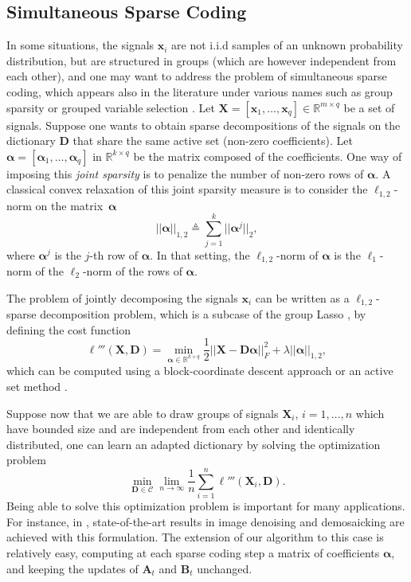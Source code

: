 \documentclass[twoside,11pt]{article}
\def\x{{\mathbf x}}
\def\l{{\ell}}
\def\X{{\mathbf X}}
\def\alphab{{\boldsymbol\alpha}}
\def\D{{\mathbf D}}
\def\B{{\mathbf B}}
\def\C{{\mathcal C}}
\def\Real{{\mathbb R}}
\def\A{{\mathbf A}}
\def\defin{\stackrel{\vartriangle}{=}}
\begin{document}
\subsection{Simultaneous Sparse Coding}
In some situations, the signals $\x_i$ are not i.i.d samples of an unknown
probability distribution, but are structured in groups (which are however
independent from each other), and one may want to address the problem of
simultaneous sparse coding, which appears also in the literature under various names such
as group sparsity or grouped variable
selection \citep{cotter2,turlach,yuan,obozinski,obozinski2,zhang,tropp2,tropp3}.  Let $\X =
[\x_1,\ldots,\x_q] \in \Real^{m \times q}$ be a set of signals.
Suppose one wants to obtain sparse decompositions of
the signals on the dictionary $\D$ that share the same active set (non-zero coefficients).
Let \mbox{$\alphab = [\alphab_1,\ldots,\alphab_q]$} in $\Real^{k \times q}$ be the matrix
composed of the coefficients. One way of imposing this \emph{joint sparsity}
is to penalize the number of non-zero rows of $\alphab$. A classical convex
relaxation of this joint sparsity measure is to consider the $\ell_{1,2}$-norm
on the matrix~$\alphab$
\begin{displaymath}
||\alphab||_{1,2} \defin \sum_{j=1}^k ||\alphab^j||_2,
\end{displaymath}
where $\alphab^j$ is the $j$-th row of $\alphab$. In that setting, the
$\ell_{1,2}$-norm of $\alphab$ is the $\ell_1$-norm of the $\ell_2$-norm of the rows
of $\alphab$.

The problem of jointly decomposing the signals $\x_i$ can be written as a
$\ell_{1,2}$-sparse decomposition problem, which is a subcase of the group
Lasso \citep{turlach,yuan,bach}, by defining the cost function 
\begin{displaymath}
  \l'''(\X,\D) = \min_{\alphab \in \Real^{k \times q}} \frac{1}{2}||\X-\D\alphab||_F^2 + \lambda ||\alphab||_{1,2},
\end{displaymath}
which can be computed using a block-coordinate descent approach \citep{friedman} or
an active set method \citep{roth2}.

Suppose now that we are able to draw groups of signals $\X_i$, $i=1,\ldots,n$ which have
bounded size and are independent from each other and identically distributed,
one can learn an adapted dictionary by solving the optimization problem 
\begin{displaymath}
   \min_{\D \in \C} \lim_{n \to \infty} \frac{1}{n} \sum_{i=1}^n \l'''(\X_i,\D).
\end{displaymath}
Being able to solve this optimization problem is important for many applications.
For instance, in \citet{mairal8}, state-of-the-art results in image denoising
and demosaicking are achieved with this formulation.
The extension of our algorithm to this case is relatively easy, computing at each
sparse coding step a matrix of coefficients $\alphab$, and keeping the updates
of $\A_t$ and $\B_t$ unchanged. 
\end{document}
